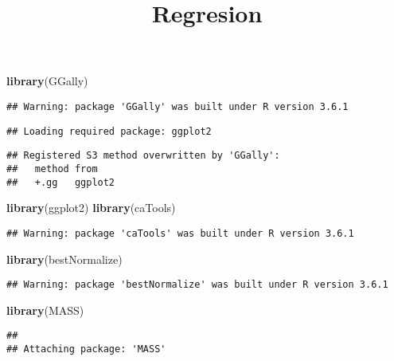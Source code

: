 \documentclass[]{article}
\title{Regresion}
\author{}
\date{}
\newenvironment{Shaded}{\begin{snugshade}}{\end{snugshade}}
\newcommand{\KeywordTok}[1]{\textcolor[rgb]{0.13,0.29,0.53}{\textbf{#1}}}
\newcommand{\NormalTok}[1]{#1}
\begin{document}
\maketitle

\begin{Shaded}
\begin{Highlighting}[]
\KeywordTok{library}\NormalTok{(GGally)}
\end{Highlighting}
\end{Shaded}

\begin{verbatim}
## Warning: package 'GGally' was built under R version 3.6.1
\end{verbatim}

\begin{verbatim}
## Loading required package: ggplot2
\end{verbatim}

\begin{verbatim}
## Registered S3 method overwritten by 'GGally':
##   method from   
##   +.gg   ggplot2
\end{verbatim}

\begin{Shaded}
\begin{Highlighting}[]
\KeywordTok{library}\NormalTok{(ggplot2)}
\KeywordTok{library}\NormalTok{(caTools)}
\end{Highlighting}
\end{Shaded}

\begin{verbatim}
## Warning: package 'caTools' was built under R version 3.6.1
\end{verbatim}

\begin{Shaded}
\begin{Highlighting}[]
\KeywordTok{library}\NormalTok{(bestNormalize)}
\end{Highlighting}
\end{Shaded}

\begin{verbatim}
## Warning: package 'bestNormalize' was built under R version 3.6.1
\end{verbatim}

\begin{Shaded}
\begin{Highlighting}[]
\KeywordTok{library}\NormalTok{(MASS)}
\end{Highlighting}
\end{Shaded}

\begin{verbatim}
## 
## Attaching package: 'MASS'
\end{verbatim}
\end{document}
